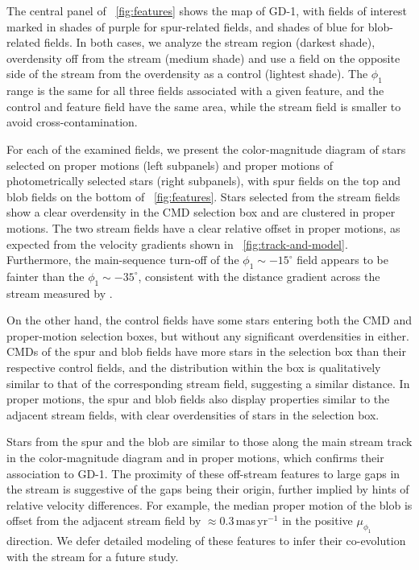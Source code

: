 \documentclass[modern]{aastex62}
\begin{document}
The central panel of \figurename~\ref{fig:features} shows the map of GD-1, with fields of interest marked in shades of purple for spur-related fields, and shades of blue for blob-related fields.
In both cases, we analyze the stream region (darkest shade), overdensity off from the stream (medium shade) and use a field on the opposite side of the stream from the overdensity as a control (lightest shade).
The $\phi_1$ range is the same for all three fields associated with a given feature, and the control and feature field have the same area, while the stream field is smaller to avoid cross-contamination.

For each of the examined fields, we present the color-magnitude diagram of stars selected on proper motions (left subpanels) and proper motions of photometrically selected stars (right subpanels), with spur fields on the top and blob fields on the bottom of \figurename~\ref{fig:features}.
Stars selected from the stream fields show a clear overdensity in the CMD selection box and are clustered in proper motions.
The two stream fields have a clear relative offset in proper motions, as expected from the velocity gradients shown in \figurename~\ref{fig:track-and-model}.
Furthermore, the main-sequence turn-off of the $\phi_1\sim-15^\circ$ field appears to be fainter than the $\phi_1\sim-35^\circ$, consistent with the distance gradient across the stream measured by \citet{Koposov:2010}.

On the other hand, the control fields have some stars entering both the CMD and proper-motion selection boxes, but without any significant overdensities in either.
CMDs of the spur and blob fields have more stars in the selection box than their respective control fields, and the distribution within the box is qualitatively similar to that of the corresponding stream field, suggesting a similar distance.
In proper motions, the spur and blob fields also display properties similar to the adjacent stream fields, with clear overdensities of stars in the selection box.

Stars from the spur and the blob are similar to those along the main stream track in the color-magnitude diagram and in proper motions, which confirms their association to GD-1.
The proximity of these off-stream features to large gaps in the stream is suggestive of the gaps being their origin, further implied by hints of relative velocity differences.
For example, the median proper motion of the blob is offset from the adjacent stream field by $\approx0.3$\,mas\,yr$^{-1}$ in the positive $\mu_{\phi_1}$ direction.
We defer detailed modeling of these features to infer their co-evolution with the stream for a future study.
\end{document}
